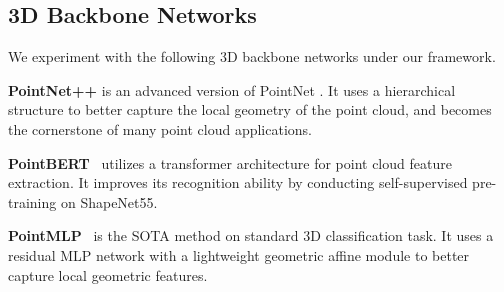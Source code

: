 \subsection{3D Backbone Networks}
We experiment with the following 3D backbone networks under our framework.

\noindent\textbf{PointNet++} \cite{qi2017pointnet++} is an advanced version of PointNet \cite{qi2017pointnet}. It uses a hierarchical structure to better capture the local geometry of the point cloud, and becomes the cornerstone of many point cloud applications.

\noindent\textbf{PointBERT}~\cite{yu2022point} utilizes a transformer architecture for point cloud feature extraction. It improves its recognition ability by conducting self-supervised pre-training on ShapeNet55.

\noindent\textbf{PointMLP}~\cite{ma2022rethinking} is the SOTA method on standard 3D classification task. It uses a residual MLP network with a lightweight geometric affine module to better capture local geometric features.


